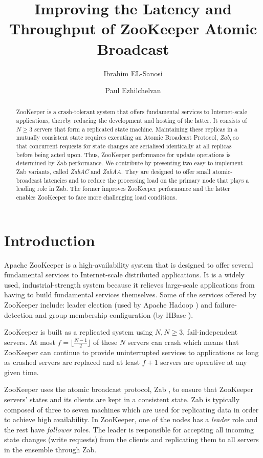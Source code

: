 \documentclass[a4paper,UKenglish]{oasics-v2016}
\title{Improving the Latency and Throughput of ZooKeeper Atomic Broadcast}
\author[1,2]{Ibrahim EL-Sanosi}
\author[2]{Paul Ezhilchelvan}
\affil[1]{Faculty of Information Technology, Sebha University, Sebha, Libya\\
	\texttt{i.elsanosi@sebhau.edu.ly}}
\affil[2]{School of Computing, Newcastle University, Newcastle Upon Tyne, UK\\
  \texttt{\{i.s.el-sanosi,paul.ezhilchelvan\}}@ncl.ac.uk}
\begin{document}
\maketitle

\begin{abstract}
	ZooKeeper is a crash-tolerant system that offers fundamental services to 
Internet-scale applications, thereby reducing the development and hosting of the latter.
It consists of $N\geq3$ servers that form a replicated state machine. 
Maintaining these replicas in a mutually consistent state requires executing 
an Atomic Broadcast Protocol,
\emph{Zab}, so that concurrent requests for state changes 
are serialised identically at all replicas before being acted upon.
Thus, ZooKeeper performance for update operations is determined by Zab performance.
We contribute by presenting two easy-to-implement Zab variants, called \emph{ZabAC} and \emph{ZabAA}. 
They are designed to offer small atomic-broadcast latencies and to reduce the processing load on the 
primary node that plays a leading role in Zab. The former improves ZooKeeper performance and the latter enables ZooKeeper
to face more challenging load conditions. 
 \end{abstract}

\section{Introduction}

Apache ZooKeeper \cite{r2} is a high-availability system that is designed to offer several
fundamental services to Internet-scale distributed applications. It is a widely used, industrial-strength
system because it relieves large-scale applications from having to build fundamental services themselves.
Some of the services offered by ZooKeeper include: leader election (used by Apache Hadoop \cite{r28}) and
failure-detection and group membership configuration (by HBase \cite{r82}).

ZooKeeper is built as a replicated system using $N, N \geq 3$, fail-independent servers.
At most $f = \lfloor\frac{N-1}{2}\rfloor$ of these $N$ servers can crash which means that ZooKeeper can continue to provide uninterrupted services to applications as long as crashed servers are replaced and
at least $f+1$ servers are operative at any given time.


ZooKeeper uses the atomic broadcast protocol, Zab \cite{r2}, to
ensure that ZooKeeper servers' states and its clients are kept in
a consistent state. Zab is typically composed of three to seven machines
which are used for replicating data in order to achieve high availability. In ZooKeeper, one of the nodes has a \emph{leader} role and the rest have
\emph{follower} roles. The leader is responsible for accepting all
incoming state changes (write requests) from the clients and replicating them to
all servers in the ensemble through Zab.
\end{document}
